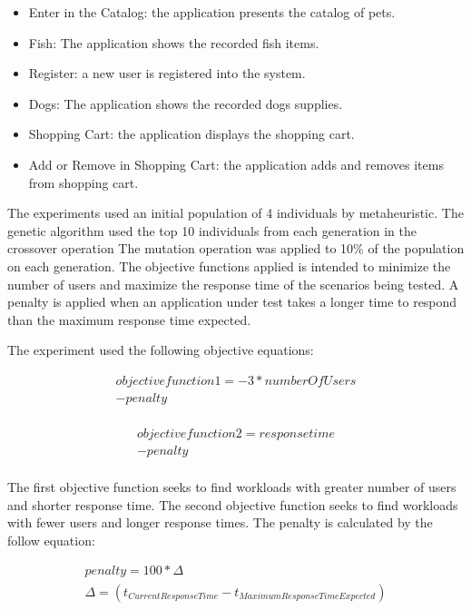 \begin{itemize}
\item Enter in the Catalog: the application presents the catalog of pets.
\item Fish: The application shows the recorded fish items.
\item Register:  a new user is registered into the system.
\item Dogs: The application shows the recorded dogs supplies.
\item Shopping Cart: the application displays the shopping cart.
\item Add or Remove in Shopping Cart: the application adds and removes items from shopping cart.
\end{itemize}

The experiments used an initial population of 4 individuals by metaheuristic. The genetic algorithm used the top 10 individuals from each generation in the crossover operation  The mutation operation was applied to 10\% of the population on each generation. The objective functions applied is intended to minimize the number of users and maximize the response time of the scenarios being tested. A penalty is applied when an application under test takes a longer time to respond than the maximum response time expected. 

The experiment used the following objective equations:

\begin{equation}
\begin{aligned}
objective function 1 =-3*numberOfUsers\\
-penalty\\
\end{aligned}
\end{equation}


\begin{equation}
\begin{aligned}
objective function 2 =responsetime\\
-penalty\\
\end{aligned}
\end{equation}

The first objective function seeks to find workloads with greater number of users and shorter response time. The second objective function seeks to find workloads with fewer users and longer response times. The penalty is calculated by the follow equation:

\begin{equation}
\begin{aligned}
penalty=100 * \Delta \\
\Delta=(t_{Current Response Time} - t_{Maximum Response Time Expected})\\
\end{aligned}
\end{equation}



